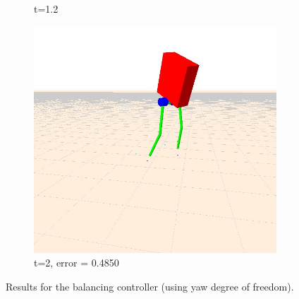 \documentclass[letterpaper, 10 pt, conference]{ieeeconf}  %
\begin{document}
\begin{figure}[tbp]
\begin{subfigure}[b]{0.3\textwidth}
        \caption{t=1.2}
        \label{fig:balanceYaw2}
    \end{subfigure} \hfill
    \begin{subfigure}[b]{0.3\textwidth}
      \centering
        \includegraphics[width=\textwidth] {figures/balanceYaw3.jpg}
        \caption{t=2, error = 0.4850}
        \label{fig:balanceYaw3}
    \end{subfigure}
  \caption{Results for the balancing controller (using yaw degree of freedom).}
  \label{fig:balancing}
\end{figure}
\end{document}
